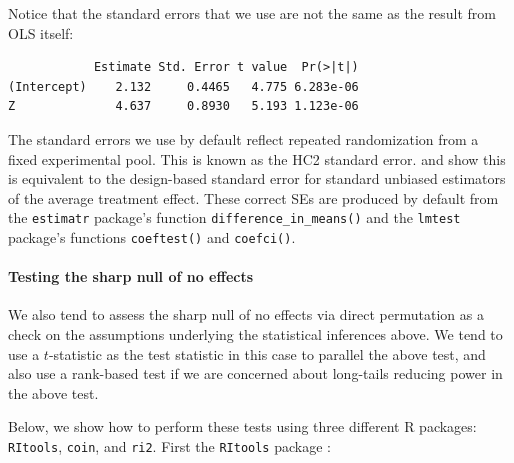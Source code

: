 \documentclass[
  12pt,
]{book}
\newenvironment{Shaded}{\begin{snugshade}}{\end{snugshade}}
\newcommand{\AttributeTok}[1]{\textcolor[rgb]{0.77,0.63,0.00}{#1}}
\newcommand{\FunctionTok}[1]{\textcolor[rgb]{0.00,0.00,0.00}{#1}}
\newcommand{\NormalTok}[1]{#1}
\newcommand{\OtherTok}[1]{\textcolor[rgb]{0.56,0.35,0.01}{#1}}
\newcommand{\SpecialCharTok}[1]{\textcolor[rgb]{0.00,0.00,0.00}{#1}}
\theoremstyle{definition}
\theoremstyle{definition}
\theoremstyle{definition}
\theoremstyle{remark}
\begin{document}
Notice that the standard errors that we use are not the same as the
result from OLS itself:

\begin{Shaded}
\end{Shaded}

\begin{verbatim}
            Estimate Std. Error t value  Pr(>|t|)
(Intercept)    2.132     0.4465   4.775 6.283e-06
Z              4.637     0.8930   5.193 1.123e-06
\end{verbatim}

The standard errors we use by default reflect repeated randomization
from a fixed experimental pool. This is known as the HC2 standard error.
\citet{lin_agnostic_2013} and \citet{samii_equivalencies_2012} show this
is equivalent to the design-based standard error for standard unbiased
estimators of the average treatment effect. These correct SEs are
produced by default from the \texttt{estimatr} package's function
\texttt{difference\_in\_means()} and the \texttt{lmtest} package's
functions \texttt{coeftest()} and \texttt{coefci()}.

\hypertarget{testing-the-sharp-null-of-no-effects}{%
\paragraph{Testing the sharp null of no
effects}\label{testing-the-sharp-null-of-no-effects}}

We also tend to assess the sharp null of no effects via direct
permutation as a check on the assumptions underlying the statistical
inferences above. We tend to use a \(t\)-statistic as the test statistic
in this case to parallel the above test, and also use a rank-based test
if we are concerned about long-tails reducing power in the above test.

Below, we show how to perform these tests using three different R
packages: \texttt{RItools}, \texttt{coin}, and \texttt{ri2}. First the
\texttt{RItools} package \citep{R-RItools}:
\end{document}
